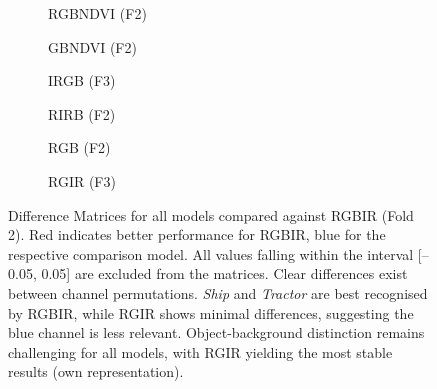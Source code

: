 \begin{figure}[htbp]
    \centering
    \begin{subfigure}{0.48\textwidth}
        \centering
        
        \caption{RGBNDVI (F2)}
        \label{fig:perm_exp_diffM_rgbndvi_f2}
    \end{subfigure}
    \begin{subfigure}{0.48\textwidth}
        \centering
        
        \caption{GBNDVI (F2)}
        \label{fig:perm_exp_diffM_gbndvi_f2}
    \end{subfigure}
    
    \begin{subfigure}{0.48\textwidth}
        \centering
        
        \caption{IRGB (F3)}
        \label{fig:perm_exp_diffM_irgb_f3}
    \end{subfigure}
    \begin{subfigure}{0.48\textwidth}
        \centering
        
        \caption{RIRB (F2)}
        \label{fig:perm_exp_diffM_RIRB_f2}
    \end{subfigure}
    
    \begin{subfigure}{0.48\textwidth}
        \centering
        
        \caption{RGB (F2)}
        \label{fig:perm_exp_diffM_RGB_f2}
    \end{subfigure}
    \begin{subfigure}{0.48\textwidth}
        \centering
        
        \caption{RGIR (F3)}
        \label{fig:perm_exp_diffM_RGIR_f3}
    \end{subfigure}

    \caption[Difference Matrices compared to RGBIR (Fold 2)]{Difference Matrices for all models compared against RGBIR (Fold 2). Red indicates better performance for RGBIR, blue for the respective comparison model. All values falling within the interval [–0.05, 0.05] are excluded from the matrices. Clear differences exist between channel permutations. \textit{Ship} and \textit{Tractor} are best recognised by RGBIR, while RGIR shows minimal differences, suggesting the blue channel is less relevant. Object-background distinction remains challenging for all models, with RGIR yielding the most stable results (own representation).}
    \label{fig:perm_exp_diffM_all}
\end{figure}

